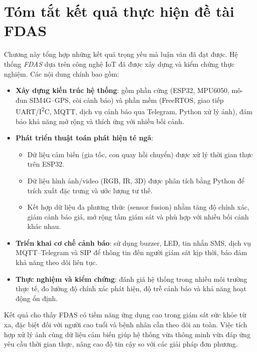 \section{Tóm tắt kết quả thực hiện đề tài FDAS}
\label{sec:summary}

Chương này tổng hợp những kết quả trọng yếu mà luận văn đã đạt được. 
Hệ thống \textit{FDAS} dựa trên công nghệ IoT đã được xây dựng và kiểm chứng thực nghiệm. 
Các nội dung chính bao gồm:  

\begin{itemize}
    \item \textbf{Xây dựng kiến trúc hệ thống}: gồm phần cứng (ESP32, MPU6050, mô-đun SIM4G--GPS, còi cảnh báo) và phần mềm (FreeRTOS, giao tiếp UART/I\textsuperscript{2}C, MQTT, dịch vụ cảnh báo qua Telegram, Python xử lý ảnh), đảm bảo khả năng mở rộng và thích ứng với nhiều bối cảnh.
    
    \item \textbf{Phát triển thuật toán phát hiện té ngã}: 
    \begin{itemize}
        \item Dữ liệu cảm biến (gia tốc, con quay hồi chuyển) được xử lý thời gian thực trên ESP32.
        \item Dữ liệu hình ảnh/video (RGB, IR, 3D) được phân tích bằng Python để trích xuất đặc trưng và ước lượng tư thế.
        \item Kết hợp dữ liệu đa phương thức (sensor fusion) nhằm tăng độ chính xác, giảm cảnh báo giả, mở rộng tầm giám sát và phù hợp với nhiều bối cảnh khác nhau.
    \end{itemize}
    
    \item \textbf{Triển khai cơ chế cảnh báo}: sử dụng buzzer, LED, tin nhắn SMS, dịch vụ MQTT--Telegram và SIP để thông tin đến người giám sát kịp thời, bảo đảm khả năng theo dõi liên tục.
    
    \item \textbf{Thực nghiệm và kiểm chứng}: đánh giá hệ thống trong nhiều môi trường thực tế, đo lường độ chính xác phát hiện, độ trễ cảnh báo và khả năng hoạt động ổn định.
\end{itemize}

Kết quả cho thấy FDAS có tiềm năng ứng dụng cao trong giám sát sức khỏe từ xa, đặc biệt đối với người cao tuổi và bệnh nhân cần theo dõi an toàn. 
Việc tích hợp xử lý ảnh cùng dữ liệu cảm biến giúp hệ thống vừa thông minh vừa đáp ứng yêu cầu thời gian thực, nâng cao độ tin cậy so với các giải pháp đơn phương.
